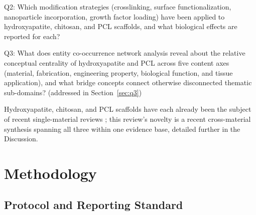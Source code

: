 \documentclass[5p,times,twocolumn]{elsarticle}
\begin{document}
Q2: Which modification strategies (crosslinking, surface functionalization, nanoparticle incorporation, growth factor loading) have been applied to hydroxyapatite, chitosan, and PCL scaffolds, and what biological effects are reported for each?

Q3: What does entity co-occurrence network analysis reveal about the relative conceptual centrality of hydroxyapatite and PCL across five content axes (material, fabrication, engineering property, biological function, and tissue application), and what bridge concepts connect otherwise disconnected thematic sub-domains? (addressed in Section~\ref{sec:q3})

Hydroxyapatite, chitosan, and PCL scaffolds have each already been the subject of recent single-material reviews \cite{ref80,ref81,ref82}; this review's novelty is a recent cross-material synthesis spanning all three within one evidence base, detailed further in the Discussion.

\section{Methodology}

\subsection{Protocol and Reporting Standard}
\end{document}
